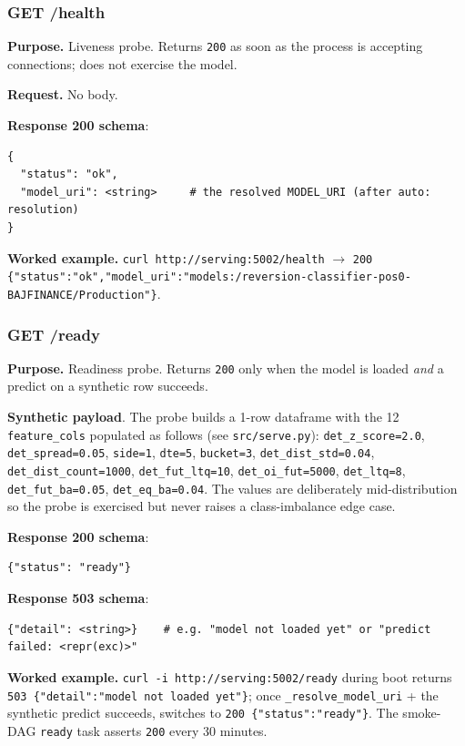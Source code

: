 \documentclass[11pt,a4paper]{article}
\begin{document}
\subsubsection{GET /health}

\textbf{Purpose.} Liveness probe. Returns \texttt{200} as soon as the process is accepting connections; does not exercise the model.

\textbf{Request.} No body.

\textbf{Response 200 schema}:
\begin{lstlisting}[style=bashstyle]
{
  "status": "ok",
  "model_uri": <string>     # the resolved MODEL_URI (after auto: resolution)
}
\end{lstlisting}

\textbf{Worked example.} \texttt{curl http://serving:5002/health} $\to$ \texttt{200 \{"status":"ok","model\_uri":"models:/reversion-classifier-pos0-BAJFINANCE/Production"\}}.

\subsubsection{GET /ready}

\textbf{Purpose.} Readiness probe. Returns \texttt{200} only when the model is loaded \emph{and} a predict on a synthetic row succeeds.

\textbf{Synthetic payload}. The probe builds a 1-row dataframe with the 12 \texttt{feature\_cols} populated as follows (see \texttt{src/serve.py}): \texttt{det\_z\_score=2.0}, \texttt{det\_spread=0.05}, \texttt{side=1}, \texttt{dte=5}, \texttt{bucket=3}, \texttt{det\_dist\_std=0.04}, \texttt{det\_dist\_count=1000}, \texttt{det\_fut\_ltq=10}, \texttt{det\_oi\_fut=5000}, \texttt{det\_ltq=8}, \texttt{det\_fut\_ba=0.05}, \texttt{det\_eq\_ba=0.04}. The values are deliberately mid-distribution so the probe is exercised but never raises a class-imbalance edge case.

\textbf{Response 200 schema}:
\begin{lstlisting}[style=bashstyle]
{"status": "ready"}
\end{lstlisting}

\textbf{Response 503 schema}:
\begin{lstlisting}[style=bashstyle]
{"detail": <string>}    # e.g. "model not loaded yet" or "predict failed: <repr(exc)>"
\end{lstlisting}

\textbf{Worked example.} \texttt{curl -i http://serving:5002/ready} during boot returns \texttt{503 \{"detail":"model not loaded yet"\}}; once \texttt{\_resolve\_model\_uri} + the synthetic predict succeeds, switches to \texttt{200 \{"status":"ready"\}}. The smoke-DAG \texttt{ready} task asserts \texttt{200} every 30 minutes.
\end{document}
